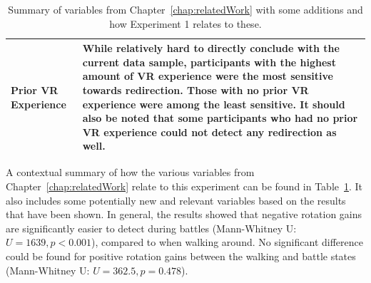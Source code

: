 \begin{table}[h!]
{\begin{tabularx}{\textwidth}{|X|X|}
\hline
Prior VR Experience & While relatively hard to directly conclude with the current data sample, participants with the highest amount of VR experience were the most sensitive towards redirection. Those with no prior VR experience were among the least sensitive. It should also be noted that some participants who had no prior VR experience could not detect any redirection as well. \\
\hline
\end{tabularx}}
\caption[Experiment 1: Summary Over Contextual Variables in Relation To Detection Thresholds]{Summary of variables from Chapter~\ref{chap:relatedWork} with some additions and how Experiment 1 relates to these.}
\label{table:ex1VariableSummary}
\end{table}

A contextual summary of how the various variables from Chapter~\ref{chap:relatedWork} relate to this experiment can be found in Table~\ref{table:ex1VariableSummary}. It also includes some potentially new and relevant variables based on the results that have been shown. In general, the results showed that negative rotation gains are significantly easier to detect during battles (Mann-Whitney U: $U = 1639, p < 0.001$), compared to when walking around. No significant difference could be found for positive rotation gains between the walking and battle states (Mann-Whitney U: $U = 362.5, p = 0.478$). 